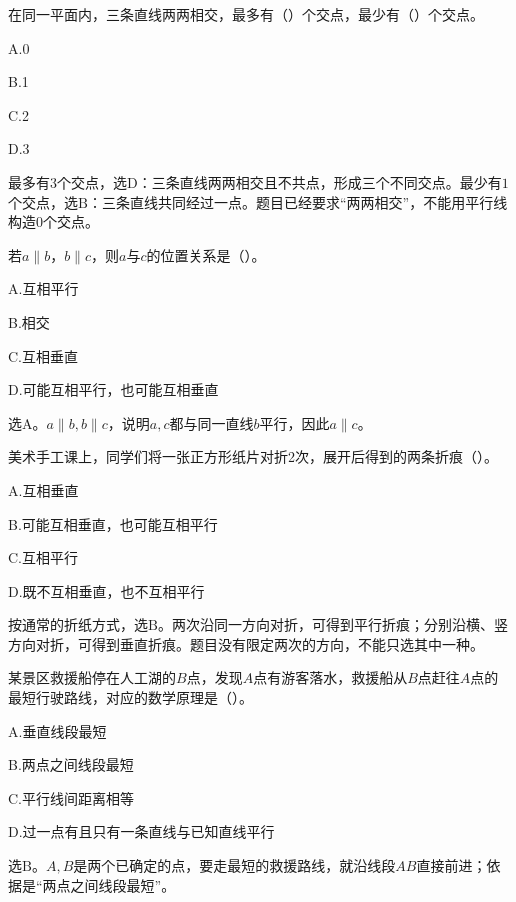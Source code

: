 在同一平面内，三条直线两两相交，最多有（\hspace{1.8em}）个交点，最少有（\hspace{1.8em}）个交点。\par
\noindent A.0\par
\noindent B.1\par
\noindent C.2\par
\noindent D.3\par
\begin{BookAnswer}
最多有\(3\)个交点，选\(\mathrm D\)：三条直线两两相交且不共点，形成三个不同交点。最少有\(1\)个交点，选\(\mathrm B\)：三条直线共同经过一点。题目已经要求“两两相交”，不能用平行线构造\(0\)个交点。
\end{BookAnswer}

若\(a\parallel b\)，\allowbreak{}\(b\parallel c\)，则\(a\)与\(c\)的位置关系是（\hspace{1.8em}）。\par
\noindent A.互相平行\par
\noindent B.相交\par
\noindent C.互相垂直\par
\noindent D.可能互相平行，也可能互相垂直\par
\begin{BookAnswer}
选\(\mathrm A\)。\(a\parallel b,b\parallel c\)，说明\(a,c\)都与同一直线\(b\)平行，因此\(a\parallel c\)。
\end{BookAnswer}

美术手工课上，同学们将一张正方形纸片对折2次，展开后得到的两条折痕（\hspace{1.8em}）。\par
\noindent A.互相垂直\par
\noindent B.可能互相垂直，也可能互相平行\par
\noindent C.互相平行\par
\noindent D.既不互相垂直，也不互相平行\par
\begin{BookAnswer}
按通常的折纸方式，选\(\mathrm B\)。两次沿同一方向对折，可得到平行折痕；分别沿横、竖方向对折，可得到垂直折痕。题目没有限定两次的方向，不能只选其中一种。
\end{BookAnswer}

某景区救援船停在人工湖的\(B\)点，发现\(A\)点有游客落水，救援船从\(B\)点赶往\(A\)点的最短行驶路线，对应的数学原理是（\hspace{1.8em}）。\par
\noindent A.垂直线段最短\par
\noindent B.两点之间线段最短\par
\noindent C.平行线间距离相等\par
\noindent D.过一点有且只有一条直线与已知直线平行\par
{}
\begin{BookAnswer}
选\(\mathrm B\)。\(A,B\)是两个已确定的点，要走最短的救援路线，就沿线段\(AB\)直接前进；依据是“两点之间线段最短”。
\end{BookAnswer}

